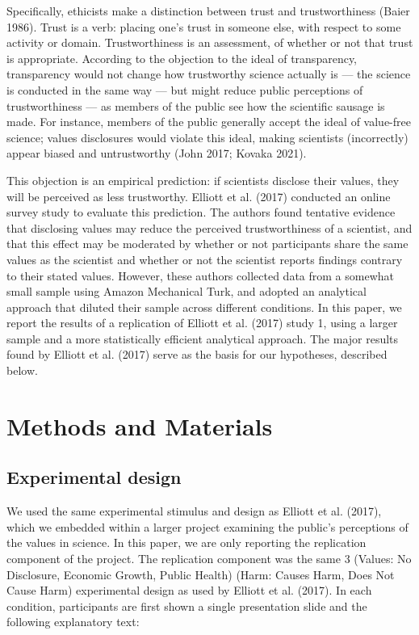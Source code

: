 \documentclass[
  letterpaper,
  DIV=11,
  numbers=noendperiod]{scrartcl}
\begin{document}
Specifically, ethicists make a distinction between trust and
trustworthiness (Baier 1986). Trust is a verb: placing one's trust in
someone else, with respect to some activity or domain. Trustworthiness
is an assessment, of whether or not that trust is appropriate. According
to the objection to the ideal of transparency, transparency would not
change how trustworthy science actually is --- the science is conducted
in the same way --- but might reduce public perceptions of
trustworthiness --- as members of the public see how the scientific
sausage is made. For instance, members of the public generally accept
the ideal of value-free science; values disclosures would violate this
ideal, making scientists (incorrectly) appear biased and untrustworthy
(John 2017; Kovaka 2021).

This objection is an empirical prediction: if scientists disclose their
values, they will be perceived as less trustworthy. Elliott et al.
(2017) conducted an online survey study to evaluate this prediction. The
authors found tentative evidence that disclosing values may reduce the
perceived trustworthiness of a scientist, and that this effect may be
moderated by whether or not participants share the same values as the
scientist and whether or not the scientist reports findings contrary to
their stated values. However, these authors collected data from a
somewhat small sample using Amazon Mechanical Turk, and adopted an
analytical approach that diluted their sample across different
conditions. In this paper, we report the results of a replication of
Elliott et al. (2017) study 1, using a larger sample and a more
statistically efficient analytical approach. The major results found by
Elliott et al. (2017) serve as the basis for our hypotheses, described
below.

\hypertarget{methods-and-materials}{%
\section{Methods and Materials}\label{methods-and-materials}}

\hypertarget{experimental-design}{%
\subsection{Experimental design}\label{experimental-design}}

We used the same experimental stimulus and design as Elliott et al.
(2017), which we embedded within a larger project examining the public's
perceptions of the values in science. In this paper, we are only
reporting the replication component of the project. The replication
component was the same 3 (Values: No Disclosure, Economic Growth, Public
Health)  (Harm: Causes Harm, Does Not Cause Harm) experimental
design as used by Elliott et al. (2017). In each condition, participants
are first shown a single presentation slide and the following
explanatory text:
\end{document}

